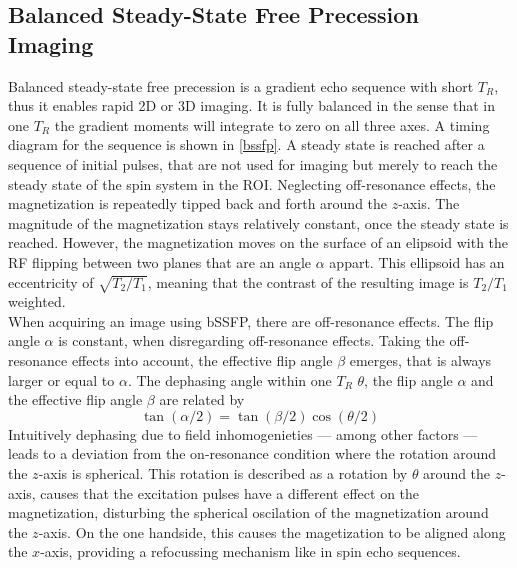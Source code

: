 \subsection{Balanced Steady-State Free Precession Imaging}
Balanced steady-state free precession is a gradient echo sequence with short $T_R$, thus it enables rapid 2D or 3D imaging.
It is fully balanced in the sense that in one $T_R$ the gradient moments will integrate to zero on all three axes.
A timing diagram for the sequence is shown in \ref{bssfp}.
A steady state is reached after a sequence of initial pulses, that are not used for imaging but merely to reach the steady state of the spin system in the ROI.
Neglecting off-resonance effects, the magnetization is repeatedly tipped back and forth around the $z$-axis.
The magnitude of the magnetization stays relatively constant, once the steady state is reached.
However, the magnetization moves on the surface of an elipsoid with the RF flipping between two planes that are an angle $\alpha$ appart.
This ellipsoid has an eccentricity of $\sqrt{T_2 / T_1}$, meaning that the contrast of the resulting image is $T_2 / T_1$ weighted. \\
When acquiring an image using bSSFP, there are off-resonance effects.
The flip angle $\alpha$ is constant, when disregarding off-resonance effects.
Taking the off-resonance effects into account, the effective flip angle $\beta$ emerges, that is always larger or equal to $\alpha$.
The dephasing angle within one $T_R$ $\theta$, the flip angle $\alpha$ and the effective flip angle $\beta$ are related by
\[ \tan(\alpha / 2) = \tan(\beta / 2) \cos(\theta / 2) \]
Intuitively dephasing due to field inhomogenieties --- among other factors --- leads to a deviation from the on-resonance condition where the rotation around the $z$-axis is spherical.
This rotation is described as a rotation by $\theta$ around the $z$-axis, causes that the excitation pulses have a different effect on the magnetization, disturbing the spherical oscilation of the magnetization around the $z$-axis.
On the one handside, this causes the magetization to be aligned along the $x$-axis, providing a refocussing mechanism like in spin echo sequences.
